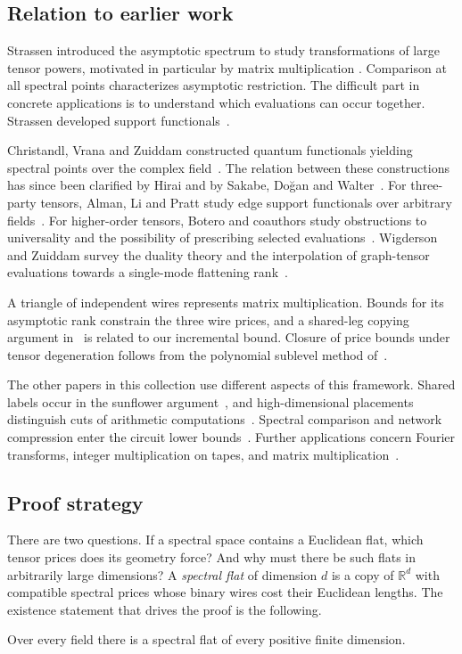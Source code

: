 \subsection{Relation to earlier work}

Strassen introduced the asymptotic spectrum to study transformations of
large tensor powers, motivated in particular by matrix multiplication
\cite{Strassen87,Strassen1988}. Comparison at all spectral points
characterizes asymptotic restriction. The difficult part in concrete
applications is to understand which evaluations can occur together.
Strassen developed support functionals~\cite{Strassen91}.

Christandl, Vrana and Zuiddam constructed quantum functionals yielding
spectral points over the complex field~\cite{CVZ}. The relation between
these constructions has since been clarified by Hirai and by Sakabe,
Do\u{g}an and Walter~\cite{hirai,sdw}. For three-party tensors, Alman,
Li and Pratt study edge support functionals over arbitrary
fields~\cite{almanlipratt}. For higher-order tensors, Botero and
coauthors study obstructions to universality and the possibility of
prescribing selected evaluations~\cite{botero}. Wigderson and Zuiddam
survey the duality theory and the interpolation of graph-tensor
evaluations towards a single-mode flattening rank~\cite{WZ}.

A triangle of independent wires represents matrix multiplication.
Bounds for its asymptotic rank constrain the three wire prices, and a
shared-leg copying argument in~\cite{nine} is related to our
incremental bound. Closure of price bounds under tensor degeneration
follows from the polynomial sublevel method
of~\cite{SpectralSublevels}.

The other papers in this collection use different aspects of this
framework. Shared labels occur in the sunflower argument~\cite{oaS},
and high-dimensional placements distinguish cuts of arithmetic
computations~\cite{oaH}. Spectral comparison and network compression
enter the circuit lower bounds~\cite{oaP}. Further applications concern
Fourier transforms, integer multiplication on tapes, and matrix
multiplication~\cite{oaF,oaT,oaM}.

\subsection{Proof strategy}

There are two questions. If a spectral space contains a Euclidean
flat, which tensor prices does its geometry force? And why must there
be such flats in arbitrarily large dimensions? A \emph{spectral flat}
of dimension \(d\) is a copy of \(\mathbb R^d\) with compatible
spectral prices whose binary wires cost their Euclidean lengths. The
existence statement that drives the proof is the following.
\begin{theorem}\label{thm:flats}
Over every field there is a spectral flat of every positive finite
dimension.
\end{theorem}

